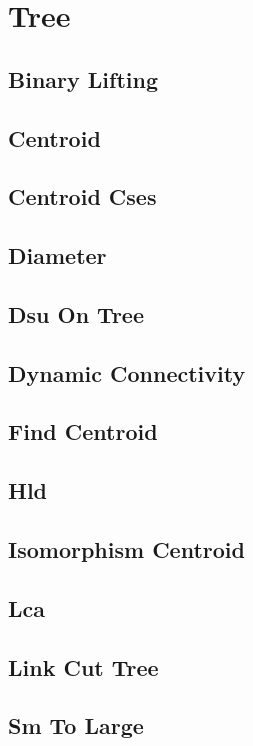 \documentclass[10pt,landscape,twocolumn,a4paper,notitlepage]{article}
\newcommand\cppfile[2][]{

}
\begin{document}

\section{Tree}

\subsection{Binary Lifting}
\cppfile{tree/binary_lifting.cpp}

\subsection{Centroid}
\cppfile{tree/centroid.cpp}

\subsection{Centroid Cses}
\cppfile{tree/centroid_cses.cpp}

\subsection{Diameter}
\cppfile{tree/diameter.cpp}

\subsection{Dsu On Tree}
\cppfile{tree/DSU_on_Tree.cpp}

\subsection{Dynamic Connectivity}
\cppfile{tree/dynamic_connectivity.cpp}

\subsection{Find Centroid}
\cppfile{tree/find_centroid.cpp}

\subsection{Hld}
\cppfile{tree/hld.cpp}

\subsection{Isomorphism Centroid}
\cppfile{tree/isomorphism_centroid.cpp}

\subsection{Lca}
\cppfile{tree/LCA.cpp}

\subsection{Link Cut Tree}
\cppfile{tree/link_cut_tree.cpp}

\subsection{Sm To Large}
\cppfile{tree/sm_to_large.cpp}

\newpage
\end{document}
